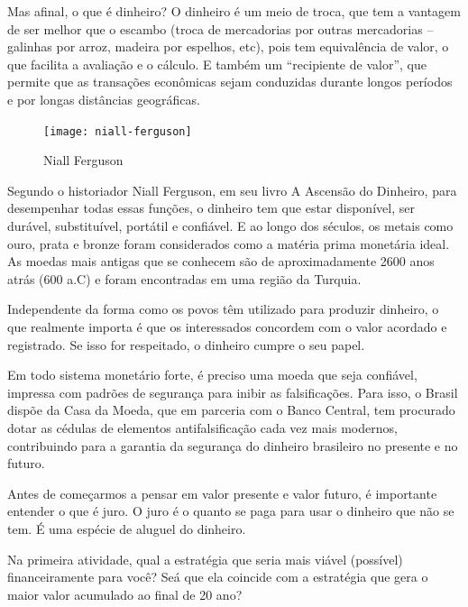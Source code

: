 \begin{knowledge}

Mas afinal, o que é dinheiro? O dinheiro é um meio de troca, que tem a vantagem de ser melhor que o escambo (troca de mercadorias por outras mercadorias – galinhas por arroz, madeira por espelhos, etc), pois tem equivalência de valor, o que facilita a avaliação e o cálculo. E também um “recipiente de valor”, que permite que as transações econômicas sejam conduzidas durante longos períodos e por longas distâncias geográficas.

\begin{figure}
\vspace{-1em}
\texttt{[image: niall-ferguson]}

\caption{Niall Ferguson}
\end{figure}

Segundo o historiador Niall Ferguson, em seu livro A Ascensão do Dinheiro, para desempenhar todas essas funções, o dinheiro tem que estar disponível, ser durável, substituível, portátil e confiável. E ao longo dos séculos, os metais como ouro, prata e bronze foram considerados como a matéria prima monetária ideal. As moedas mais antigas que se conhecem são de aproximadamente 2600 anos atrás (600 a.C) e foram encontradas em uma região da Turquia. 

Independente da forma como os povos têm utilizado para produzir dinheiro, o que realmente importa é que os interessados concordem com o valor acordado e registrado. Se isso for respeitado, o dinheiro cumpre o seu papel. 

Em todo sistema monetário forte, é preciso uma moeda que seja confiável, impressa com padrões de segurança para inibir as falsificações. Para isso, o Brasil dispõe da Casa da Moeda, que em parceria com o Banco Central, tem procurado dotar as cédulas de elementos antifalsificação cada vez mais modernos, contribuindo para a garantia da segurança do dinheiro brasileiro no presente e no futuro.

\end{knowledge}


Antes de começarmos a pensar em valor presente e valor futuro, é importante entender o que é juro. O juro é o quanto se paga para usar o dinheiro que não se tem. É uma espécie de aluguel do dinheiro.

Na primeira atividade, qual a estratégia que seria mais viável (possível) financeiramente para você? Seá que ela coincide com a estratégia que gera o maior valor acumulado ao final de 20 ano?

